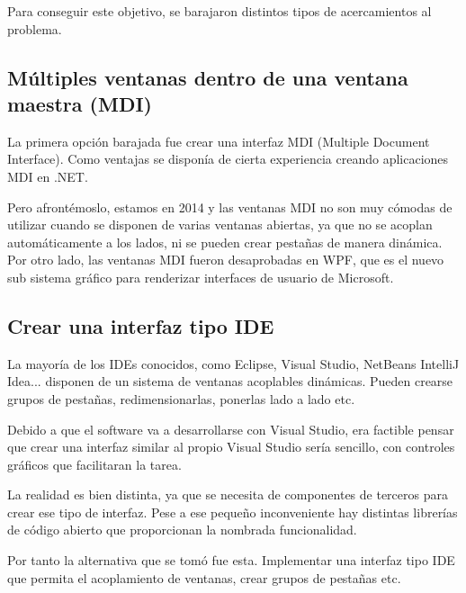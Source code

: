 Para conseguir este objetivo, se barajaron distintos tipos de acercamientos al problema.

\subsection{M\'ultiples ventanas dentro de una ventana maestra (MDI)}
La primera opci\'on barajada fue crear una interfaz MDI (Multiple Document Interface). Como ventajas se
dispon\'ia de cierta experiencia creando aplicaciones MDI en .NET.

Pero afront\'emoslo, estamos en 2014 y las ventanas MDI no son muy c\'omodas de utilizar cuando se disponen de varias ventanas
abiertas, ya que no se acoplan autom\'aticamente a los lados, ni se pueden crear pesta\~nas de manera din\'amica.
Por otro lado, las ventanas MDI fueron desaprobadas en WPF, que es el nuevo sub sistema gr\'afico para renderizar 
interfaces de usuario de Microsoft.

\subsection{Crear una interfaz tipo IDE}
La mayor\'ia de los IDEs conocidos, como Eclipse, Visual Studio, NetBeans IntelliJ Idea... disponen de un sistema de 
ventanas acoplables din\'amicas. Pueden crearse grupos de pesta\~nas, redimensionarlas, ponerlas lado a lado etc.

Debido a que el software va a desarrollarse con Visual Studio, era factible pensar que crear una interfaz similar al propio
Visual Studio ser\'ia sencillo, con controles gr\'aficos que facilitaran la tarea.

La realidad es bien distinta, ya que se necesita de componentes de terceros para crear ese tipo de interfaz. Pese a ese
peque\~no inconveniente hay distintas librer\'ias de c\'odigo abierto que proporcionan la nombrada funcionalidad.

Por tanto la alternativa que se tom\'o fue esta. Implementar una interfaz tipo IDE que permita el acoplamiento de ventanas,
crear grupos de pesta\~nas etc.